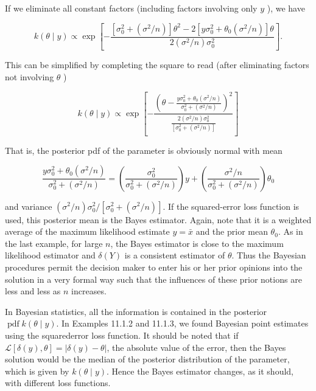 If we eliminate all constant factors (including factors involving only $y$ ), we have

$$
k(\theta \mid y) \propto \exp \left[-\frac{\left[\sigma_{0}^{2}+\left(\sigma^{2} / n\right)\right] \theta^{2}-2\left[y \sigma_{0}^{2}+\theta_{0}\left(\sigma^{2} / n\right)\right] \theta}{2\left(\sigma^{2} / n\right) \sigma_{0}^{2}}\right] .
$$

This can be simplified by completing the square to read (after eliminating factors not involving $\theta$ )

$$
k(\theta \mid y) \propto \exp \left[-\frac{\left(\theta-\frac{y \sigma_{0}^{2}+\theta_{0}\left(\sigma^{2} / n\right)}{\sigma_{0}^{2}+\left(\sigma^{2} / n\right)}\right)^{2}}{\frac{2\left(\sigma^{2} / n\right) \sigma_{0}^{2}}{\left[\sigma_{0}^{2}+\left(\sigma^{2} / n\right)\right]}}\right]
$$

That is, the posterior pdf of the parameter is obviously normal with mean


\begin{equation*}
\frac{y \sigma_{0}^{2}+\theta_{0}\left(\sigma^{2} / n\right)}{\sigma_{0}^{2}+\left(\sigma^{2} / n\right)}=\left(\frac{\sigma_{0}^{2}}{\sigma_{0}^{2}+\left(\sigma^{2} / n\right)}\right) y+\left(\frac{\sigma^{2} / n}{\sigma_{0}^{2}+\left(\sigma^{2} / n\right)}\right) \theta_{0} \tag{11.1.11}
\end{equation*}


and variance $\left(\sigma^{2} / n\right) \sigma_{0}^{2} /\left[\sigma_{0}^{2}+\left(\sigma^{2} / n\right)\right]$. If the squared-error loss function is used, this posterior mean is the Bayes estimator. Again, note that it is a weighted average of the maximum likelihood estimate $y=\bar{x}$ and the prior mean $\theta_{0}$. As in the last example, for large $n$, the Bayes estimator is close to the maximum likelihood estimator and $\delta(Y)$ is a consistent estimator of $\theta$. Thus the Bayesian procedures permit the decision maker to enter his or her prior opinions into the solution in a very formal way such that the influences of these prior notions are less and less as $n$ increases.

In Bayesian statistics, all the information is contained in the posterior $\operatorname{pdf} k(\theta \mid y)$. In Examples 11.1.2 and 11.1.3, we found Bayesian point estimates using the squarederror loss function. It should be noted that if $\mathcal{L}[\delta(y), \theta]=|\delta(y)-\theta|$, the absolute value of the error, then the Bayes solution would be the median of the posterior distribution of the parameter, which is given by $k(\theta \mid y)$. Hence the Bayes estimator changes, as it should, with different loss functions.

